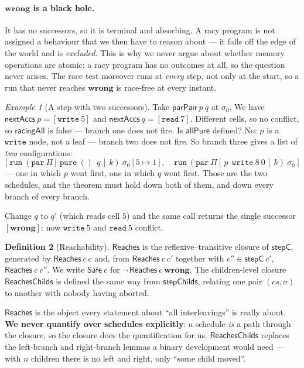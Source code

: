 \documentclass[11pt,a4paper]{article}
\theoremstyle{definition}
\newtheorem{definition}{Definition}
\theoremstyle{plain}
\theoremstyle{remark}
\newtheorem{example}[definition]{Example}
\newcommand{\st}{\sigma}
\newcommand{\Reaches}{\mathsf{Reaches}}
\newcommand{\wrong}{\mathbf{wrong}}
\newcommand{\upd}[3]{#1[#2 \mapsto #3]}
\begin{document}
\paragraph{$\wrong$ is a black hole.}
It has no successors, so it is terminal and absorbing. A racy program is not assigned a
behaviour that we then have to reason about --- it falls off the edge of the world and is
\emph{excluded}. This is why we never argue about whether memory operations are atomic: a
racy program has no outcomes at all, so the question never arises. The race test moreover
runs at \emph{every} step, not only at the start, so a run that never reaches $\wrong$ is
race-free at every instant.

\begin{example}[A step with two successors]\label{ex:step}
Take $\mathsf{parPair}\ p\ q$ at $\st_0$. We have
$\mathsf{nextAccs}\ p = [\texttt{write}\ 5]$ and
$\mathsf{nextAccs}\ q = [\texttt{read}\ 7]$. Different cells, so no conflict, so
$\mathsf{racingAll}$ is false --- branch one does not fire. Is $\mathsf{allPure}$ defined?
No: $p$ is a $\texttt{write}$ node, not a leaf --- branch two does not fire. So branch three
gives a list of \emph{two} configurations:
\[
  \bigl[\ \texttt{run}\ (\texttt{par}\ \Pi[\,\texttt{pure}\ ()\ \ q\,]\ k)\ \upd{\st_0}{5}{1},
  \quad \texttt{run}\ (\texttt{par}\ \Pi[\,p\ \ \texttt{write}\ 8\ 0\,]\ k)\ \st_0\ \bigr]
\]
--- one in which $p$ went first, one in which $q$ went first. Those are the two schedules,
and the theorem must hold down both of them, and down every branch of every branch.

Change $q$ to $q'$ (which reads cell $5$) and the same call returns the single successor
$[\wrong]$: now $\texttt{write}\ 5$ and $\texttt{read}\ 5$ conflict.
\end{example}

\begin{definition}[Reachability]\label{def:reaches}
$\Reaches$ is the reflexive--transitive closure of $\mathsf{stepC}$, generated by
$\Reaches\ c\ c$ and, from $\Reaches\ c\ c'$ together with $c'' \in \mathsf{stepC}\ c'$,
$\Reaches\ c\ c''$. We write $\mathsf{Safe}\ c$ for $\neg\,\Reaches\ c\ \wrong$. The
children-level closure $\mathsf{ReachesChilds}$ is defined the same way from
$\mathsf{stepChilds}$, relating one pair $(cs,\st)$ to another with nobody having aborted.
\end{definition}

$\Reaches$ is the object every statement about ``all interleavings'' is really about.
\textbf{We never quantify over schedules explicitly}: a schedule \emph{is} a path through
the closure, so the closure does the quantification for us. $\mathsf{ReachesChilds}$
replaces the left-branch and right-branch lemmas a binary development would need --- with
$n$ children there is no left and right, only ``some child moved''.
\end{document}

